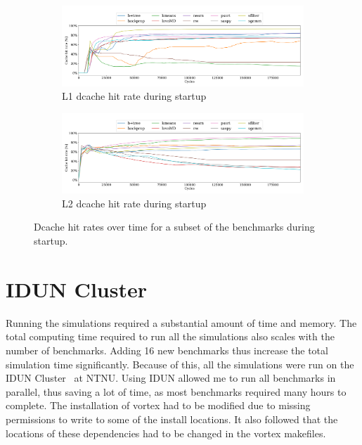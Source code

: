 \begin{figure}
    \centering
    \begin{subfigure}[t]{\textwidth}
        \centering
        \includegraphics[width=\textwidth]{figures/L1cachehit_vlsim.png}
        \caption{L1 dcache hit rate during startup}
        \label{fig:l1_cache_startup_hitrate}
    \end{subfigure}
    \hfill
    \begin{subfigure}[t]{\textwidth}
        \centering
        \includegraphics[width=\textwidth]{figures/L2cachehit_vlsim.png}
        \caption{L2 dcache hit rate during startup}
        \label{fig:l2_cache_startup_hitrate}
    \end{subfigure}
    \caption[Dcache hit rates over time during startup.]{Dcache hit rates over time for a subset of the benchmarks during startup.}
    \label{fig:dcache_startup_hitrate}
\end{figure}

\section{IDUN Cluster}

Running the simulations required a substantial amount of time and memory. The total computing time required to run all the simulations also scales with the number of benchmarks. Adding 16 new benchmarks thus increase the total simulation time significantly. Because of this, all the simulations were run on the IDUN Cluster~\cite{Idun_tech_report} at NTNU. Using IDUN allowed me to run all benchmarks in parallel, thus saving a lot of time, as most benchmarks required many hours to complete.
\newpage
The installation of \Gls{vortex} had to be modified due to missing permissions to write to some of the install locations. It also followed that the locations of these dependencies had to be changed in the \Gls{vortex} makefiles.

